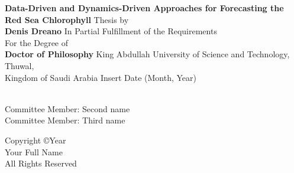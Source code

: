 \documentclass[onecolumn, 12 pt, doublespace, fullpage, letterpaper, twoside, openright]{report}
\begin{document}

\vspace{2pt}
\thispagestyle{empty}
\addvspace{10mm}

\begin{center}
{\bf\Large Data-Driven and Dynamics-Driven Approaches for Forecasting the Red Sea Chlorophyll}\vfill
{\Large Thesis by}\\
{\bf\Large Denis Dreano}\vfill
{\Large In Partial Fulfillment of the Requirements}\\[12pt]
{\Large For the Degree of}\\[12pt]
{\bf\Large Doctor of Philosophy} \vfill
{King Abdullah University of Science and Technology, Thuwal,}\\
{Kingdom of Saudi Arabia}
\vfill
{Insert Date (Month, Year)}\vfill

\end{center}

\newpage
{}

\vspace{6\baselineskip}

\\
Committee Member: Second name\\
Committee Member: Third name\vfill


\newpage
\vspace*{\fill}
\begin{center}
{Copyright \copyright Year}\\
{Your Full Name}\\
{All Rights Reserved}
\end{center}
\end{document}
